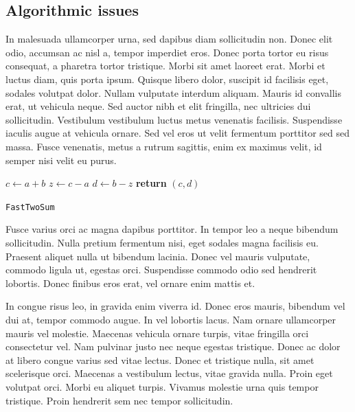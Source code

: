 \documentclass{article}
\begin{document}
\subsection{Algorithmic issues}

In malesuada ullamcorper urna, sed dapibus diam sollicitudin non. Donec elit odio, accumsan ac nisl a, tempor imperdiet eros. Donec porta tortor eu risus consequat, a pharetra tortor tristique. Morbi sit amet laoreet erat. Morbi et luctus diam, quis porta ipsum. Quisque libero dolor, suscipit id facilisis eget, sodales volutpat dolor. Nullam vulputate interdum aliquam. Mauris id convallis erat, ut vehicula neque. Sed auctor nibh et elit fringilla, nec ultricies dui sollicitudin. Vestibulum vestibulum luctus metus venenatis facilisis. Suspendisse iaculis augue at vehicula ornare. Sed vel eros ut velit fermentum porttitor sed sed massa. Fusce venenatis, metus a rutrum sagittis, enim ex maximus velit, id semper nisi velit eu purus.

\begin{center}
	\begin{minipage}{0.5\linewidth} %
		\begin{algorithm}[H]
			\medskip
			$c \leftarrow a + b$ \;
			$z \leftarrow c - a$ \;
			$d \leftarrow b - z$ \;
			{\bf return} $(c,d)$ \;
			\caption{\texttt{FastTwoSum}} %
			\label{alg:fastTwoSum}   %
		\end{algorithm}
	\end{minipage}
\end{center}

Fusce varius orci ac magna dapibus porttitor. In tempor leo a neque bibendum sollicitudin. Nulla pretium fermentum nisi, eget sodales magna facilisis eu. Praesent aliquet nulla ut bibendum lacinia. Donec vel mauris vulputate, commodo ligula ut, egestas orci. Suspendisse commodo odio sed hendrerit lobortis. Donec finibus eros erat, vel ornare enim mattis et.

\begin{question}
	In congue risus leo, in gravida enim viverra id. Donec eros mauris, bibendum vel dui at, tempor commodo augue. In vel lobortis lacus. Nam ornare ullamcorper mauris vel molestie. Maecenas vehicula ornare turpis, vitae fringilla orci consectetur vel. Nam pulvinar justo nec neque egestas tristique. Donec ac dolor at libero congue varius sed vitae lectus. Donec et tristique nulla, sit amet scelerisque orci. Maecenas a vestibulum lectus, vitae gravida nulla. Proin eget volutpat orci. Morbi eu aliquet turpis. Vivamus molestie urna quis tempor tristique. Proin hendrerit sem nec tempor sollicitudin.
\end{question}
\end{document}
